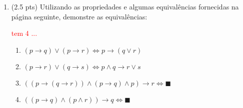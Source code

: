 \documentclass[12pt]{article}
\begin{document}
\begin{enumerate}
\begin{enumerate}
\end{enumerate}


\item (2.5 pts) Utilizando as propriedades e algumas equivalências
fornecidas na página seguinte, demonstre as equivalências:

\textcolor{red}{tem 4 ... }

\begin{enumerate}
\setlength{\itemsep}{-2pt}


\item  $(p \rightarrow q) \vee (p \rightarrow r) \Leftrightarrow p  \rightarrow  (q \vee r) $ %





\item $(p \rightarrow r)  \vee (q \rightarrow s) \Leftrightarrow p \wedge q \rightarrow  r \vee s $  %


\item $((p \rightarrow (q \rightarrow r)) \wedge (p \rightarrow q) \wedge p)  \rightarrow r \Leftrightarrow \blacksquare  $

\item $((p \rightarrow q) \wedge (p \wedge r)) \rightarrow q \Leftrightarrow \blacksquare  $

\end{enumerate}



\end{enumerate}
\end{document}
